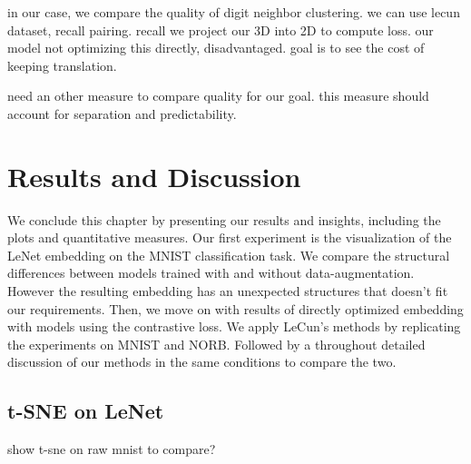 \documentclass[a4paper,12pt]{report}
\begin{document}
in our case, we compare the quality of digit neighbor clustering.
we can use lecun dataset, recall pairing.
recall we project our 3D into 2D to compute loss.
our model not optimizing this directly, disadvantaged.
goal is to see the cost of keeping translation.

need an other measure to compare quality for our goal.
this measure should account for separation and predictability.


\section{Results and Discussion}

We conclude this chapter by presenting our results and insights, including the plots and quantitative measures.
Our first experiment is the visualization of the LeNet embedding on the MNIST classification task.
We compare the structural differences between models trained with and without data-augmentation.
However the resulting embedding has an unexpected structures that doesn't fit our requirements.
Then, we move on with results of directly optimized embedding with models using the contrastive loss.
We apply LeCun's methods by replicating the experiments on MNIST and NORB.
Followed by a throughout detailed discussion of our methods in the same conditions to compare the two.


\subsection{t-SNE on LeNet}
show t-sne on raw mnist to compare?
\end{document}
